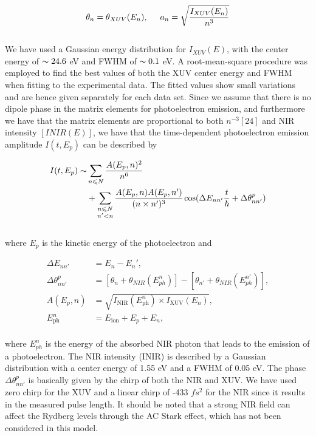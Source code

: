 \documentclass[7pt]{article}
\begin{document}
\begin{multicols}{2}
    \begin{equation}
        \theta _{n}=\theta _{XUV}(E_n), \hspace{0.5cm}  a_{n}=\sqrt{\frac{I_{XUV}(E_n)}{n^3}}
    \end{equation}
\\
We have used a Gaussian energy distribution for $I_{XUV}(E)$, with the center energy of $\thicksim 24.6$ eV and FWHM of $\thicksim 0.1$ eV. A root-mean-square procedure was employed to find the best values of both the XUV center energy and FWHM when fitting to the experimental data. The fitted values show small variations and are hence given separately for each data set. Since we assume that there is no dipole phase in the matrix elements for photoelectron emission, and furthermore we have that the matrix elements are proportional to both $n^{-3} [24]$ and NIR intensity $[INIR(E)]$, we have that the time-dependent photoelectron emission amplitude $I(t, E_p)$ can be described by

\begin{equation}
   \begin{split}
        I(t,E_{p}) \sim & \sum_{n \leqslant N} \frac{A(E_{p},n)^2}{n^6}\\
       & + \sum_{\substack{n \leqslant N \\ n'<n}} \frac{A(E_{p},n)A(E_{p},n')}{(n \times n')^3} \hspace{1.3pt} \textrm{cos}(\Delta E_{nn'} \frac{t}{\hbar} + \Delta \theta^{p}_{nn'})
   \end{split}
\end{equation}
\\
where $E_p$ is the kinetic energy of the photoelectron and

\begin{align*}
    \Delta E_{nn'} &= E_n - E_n' , \\
    \Delta \theta_{nn'}^{p} &= [\theta_{n} + \theta_{NIR}(E_{ph}^{n})] - [\theta_{n'} + \theta_{NIR}(E_{ph}^{n'})] ,\\
    A(E_{p},n) & = \sqrt{I_{\textrm{NIR}}(E^{n}_{\textrm{ph}}) \times I_{\textrm{XUV}}(E_{n})} ,\\
    E^n_{\textrm{ph}} &= E_{\textrm{ion}} + E_p + E_n, \tag{5}
\end{align*}
\\

where $E_{ph}^{n}$ is the energy of the absorbed NIR photon that leads to the emission of a photoelectron. The NIR intensity (INIR) is described by a Gaussian distribution with a center energy of 1.55 eV and a FWHM of 0.05 eV. The phase $\Delta \theta_{nn'}^{p}$ is basically given by the chirp of both the NIR and XUV. We have used zero chirp for the XUV and a linear chirp of -433 $fs^2$ for the NIR since it results in the measured pulse length. It should be noted that a strong NIR field can affect the Rydberg levels through the AC Stark effect, which has not been considered in this model.


\end{multicols}
\end{document}
